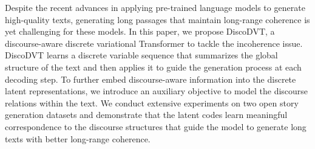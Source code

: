 Despite the recent advances in applying pre-trained language models to generate high-quality texts, generating long passages that maintain long-range coherence is yet challenging for these models. In this paper, we propose DiscoDVT, a discourse-aware discrete variational Transformer to tackle the incoherence issue. DiscoDVT learns a discrete variable sequence that summarizes the global structure of the text and then applies it to guide the generation process at each decoding step. To further embed discourse-aware information into the discrete latent representations, we introduce an auxiliary objective to model the discourse relations within the text. We conduct extensive experiments on two open story generation datasets and demonstrate that the latent codes learn meaningful correspondence to the discourse structures that guide the model to generate long texts with better long-range coherence.
